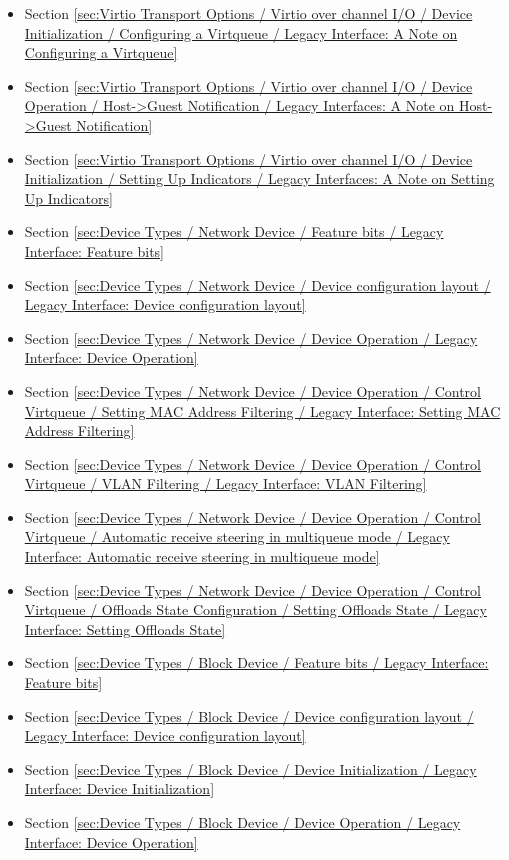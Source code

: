 \begin{itemize}
\item Section \ref{sec:Virtio Transport Options / Virtio over channel I/O / Device Initialization / Configuring a Virtqueue / Legacy Interface: A Note on Configuring a Virtqueue}
\item Section \ref{sec:Virtio Transport Options / Virtio over channel I/O / Device Operation / Host->Guest Notification / Legacy Interfaces: A Note on Host->Guest Notification}
\item Section \ref{sec:Virtio Transport Options / Virtio over channel I/O / Device Initialization / Setting Up Indicators / Legacy Interfaces: A Note on Setting Up Indicators}
\item Section \ref{sec:Device Types / Network Device / Feature bits / Legacy Interface: Feature bits}
\item Section \ref{sec:Device Types / Network Device / Device configuration layout / Legacy Interface: Device configuration layout}
\item Section \ref{sec:Device Types / Network Device / Device Operation / Legacy Interface: Device Operation}
\item Section \ref{sec:Device Types / Network Device / Device Operation / Control Virtqueue / Setting MAC Address Filtering / Legacy Interface: Setting MAC Address Filtering}
\item Section \ref{sec:Device Types / Network Device / Device Operation / Control Virtqueue / VLAN Filtering / Legacy Interface: VLAN Filtering}
\item Section \ref{sec:Device Types / Network Device / Device Operation / Control Virtqueue / Automatic receive steering in multiqueue mode / Legacy Interface: Automatic receive steering in multiqueue mode}
\item Section \ref{sec:Device Types / Network Device / Device Operation / Control Virtqueue / Offloads State Configuration / Setting Offloads State / Legacy Interface: Setting Offloads State}
\item Section \ref{sec:Device Types / Block Device / Feature bits / Legacy Interface: Feature bits}
\item Section \ref{sec:Device Types / Block Device / Device configuration layout / Legacy Interface: Device configuration layout}
\item Section \ref{sec:Device Types / Block Device / Device Initialization / Legacy Interface: Device Initialization}
\item Section \ref{sec:Device Types / Block Device / Device Operation / Legacy Interface: Device Operation}

\end{itemize}
